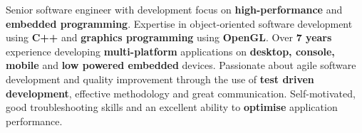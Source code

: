 
\begin{cvparagraph}

Senior software engineer with development focus on \textbf{high-performance} and \textbf{embedded programming}. Expertise in object-oriented
software development using \textbf{C++} and \textbf{graphics programming} using \textbf{OpenGL}. Over \textbf{7 years} experience developing \textbf{multi-platform} applications 
on \textbf{desktop, console, mobile} and \textbf{low powered embedded} devices. Passionate about agile software development and quality improvement
through the use of \textbf{test driven development}, effective methodology and great communication. Self-motivated,
good troubleshooting skills and an excellent ability to \textbf{optimise} application performance.

\end{cvparagraph}
